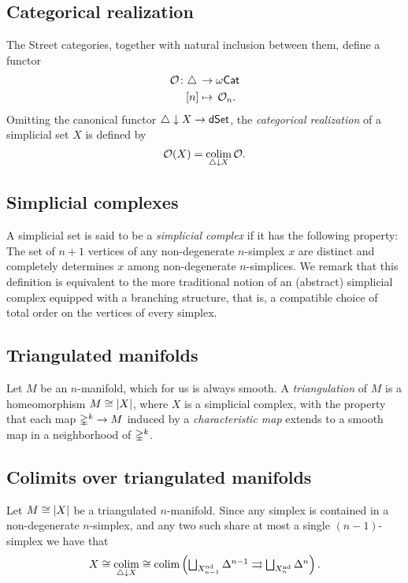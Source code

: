 \subsection{Categorical realization}

The Street categories, together with natural inclusion between them, define a functor
\[
\begin{split}
	\mathcal{O} \colon \triangle \, &\to \omega\mathsf{Cat} \\
	[n] &\mapsto \, \mathcal{O}_n.
\end{split}
\]
Omitting the canonical functor $\triangle \downarrow X \to \mathsf{dSet}$, the \textit{categorical realization} of a simplicial set $X$ is defined by
\[
\mathcal{O}(X) = \operatorname*{colim}_{\triangle \downarrow X} \mathcal{O}.
\]

\subsection{Simplicial complexes}

A simplicial set is said to be a \textit{simplicial complex} if it has the following property: The set of $n+1$ vertices of any non-degenerate $n$-simplex $x$ are distinct and completely determines $x$ among non-degenerate $n$-simplices.
We remark that this definition is equivalent to the more traditional notion of an (abstract) simplicial complex equipped with a branching structure, that is, a compatible choice of total order on the vertices of every simplex.

\subsection{Triangulated manifolds}

Let $M$ be an $n$-manifold, which for us is always smooth.
A \textit{triangulation} of $M$ is a homeomorphism $M \cong \lvert X\rvert$, where $X$ is a simplicial complex, with the property that each map $\mathbb{\Delta}^k \to M$ induced by a \textit{characteristic map} extends to a smooth map in a neighborhood of $\mathbb{\Delta}^k$.

\subsection{Colimits over triangulated manifolds}

Let $M \cong \lvert X\rvert$ be a triangulated $n$-manifold.
Since any simplex is contained in a non-degenerate $n$-simplex, and any two such share at most a single $(n-1)$-simplex we have that
\[
X \cong \operatorname*{colim}_{\triangle \downarrow X}
  \cong \textstyle \operatorname*{colim} \left(\bigsqcup_{X_{n-1}^{\mathrm{nd}}} \Delta^{n-1} \rightrightarrows \bigsqcup_{X_n^{\mathrm{nd}}} \Delta^n \right).
\]

